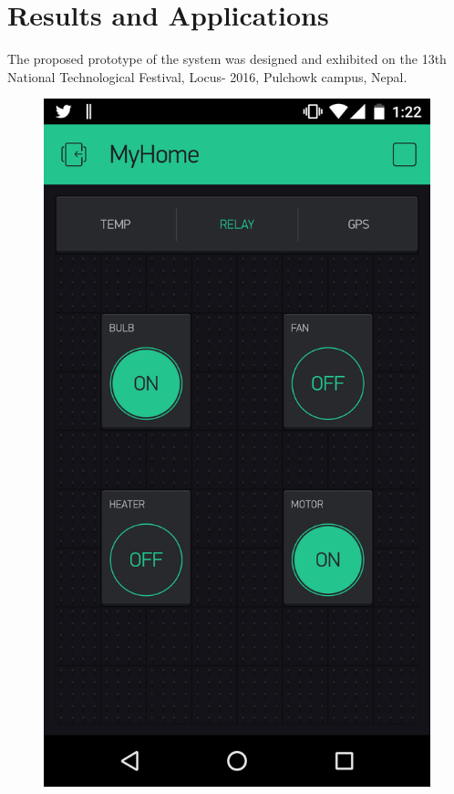 \documentclass[journal,twoside]{IEEEtran}
\begin{document}
\section{Results and Applications}

The proposed prototype of the system was designed and
exhibited on the 13th National Technological Festival, Locus-
2016, Pulchowk campus, Nepal.

\begin{figure}[!b]
    \begin{minipage}[t]{.45\linewidth}
        \includegraphics[width=\linewidth]{figure4a}

\end{minipage}
\end{figure}
\end{document}
